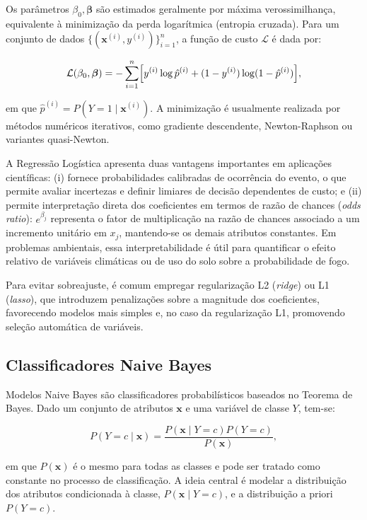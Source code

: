 Os parâmetros $\beta_0, \boldsymbol{\beta}$ são estimados geralmente por máxima verossimilhança, equivalente à minimização da perda logarítmica (entropia cruzada). Para um conjunto de dados $\{(\mathbf{x}^{(i)}, y^{(i)})\}_{i=1}^n$, a função de custo $\mathcal{L}$ é dada por:

\begin{equation}
\mathcal{L}(\beta_0, \boldsymbol{\beta})
= - \sum_{i=1}^n \Bigl[ y^{(i)} \log \hat{p}^{(i)}
+ (1 - y^{(i)}) \log(1 - \hat{p}^{(i)}) \Bigr],
\end{equation}

em que $\hat{p}^{(i)} = P(Y=1 \mid \mathbf{x}^{(i)})$. A minimização é usualmente realizada por métodos numéricos iterativos, como gradiente descendente, Newton-Raphson ou variantes quasi-Newton.

A Regressão Logística apresenta duas vantagens importantes em aplicações científicas: (i) fornece probabilidades calibradas de ocorrência do evento, o que permite avaliar incertezas e definir limiares de decisão dependentes de custo; e (ii) permite interpretação direta dos coeficientes em termos de razão de chances (\textit{odds ratio}): $e^{\beta_j}$ representa o fator de multiplicação na razão de chances associado a um incremento unitário em $x_j$, mantendo-se os demais atributos constantes. Em problemas ambientais, essa interpretabilidade é útil para quantificar o efeito relativo de variáveis climáticas ou de uso do solo sobre a probabilidade de fogo.

Para evitar sobreajuste, é comum empregar regularização L2 (\textit{ridge}) ou L1 (\textit{lasso}), que introduzem penalizações sobre a magnitude dos coeficientes, favorecendo modelos mais simples e, no caso da regularização L1, promovendo seleção automática de variáveis.

\subsection{Classificadores Naive Bayes}

Modelos Naive Bayes são classificadores probabilísticos baseados no Teorema de Bayes. Dado um conjunto de atributos $\mathbf{x}$ e uma variável de classe $Y$, tem-se:

\begin{equation}
P(Y = c \mid \mathbf{x}) = \frac{P(\mathbf{x} \mid Y=c) P(Y=c)}{P(\mathbf{x})},
\end{equation}

em que $P(\mathbf{x})$ é o mesmo para todas as classes e pode ser tratado como constante no processo de classificação. A ideia central é modelar a distribuição dos atributos condicionada à classe, $P(\mathbf{x} \mid Y=c)$, e a distribuição a priori $P(Y=c)$.

